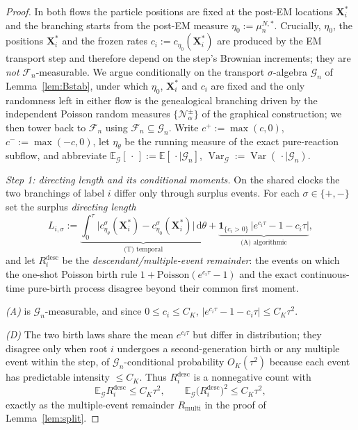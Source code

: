 \documentclass[a4paper,fleqn]{cas-sc}
\theoremstyle{definition}
\theoremstyle{remark}
\begin{document}
\begin{proof}
In both flows the particle positions are fixed at the post-EM locations
$\mathbf X^*_i$ and the branching starts from the post-EM measure
$\eta_0:=\mu^{N,*}_n$. Crucially, $\eta_0$, the positions $\mathbf X^*_i$ and the
frozen rates $c_i:=c_{\eta_0}(\mathbf X^*_i)$ are produced by the EM transport step
and therefore depend on the step's Brownian increments; they are \emph{not}
$\mathcal F_n$-measurable. We argue conditionally on the transport
$\sigma$-algebra $\mathcal G_n$ of Lemma~\ref{lem:Bstab}, under which $\eta_0$,
$\mathbf X^*_i$ and $c_i$ are fixed and the only randomness left in either flow is
the genealogical branching driven by the independent Poisson random measures
$\{\mathcal N^\pm_\alpha\}$ of the graphical construction; we then tower back to
$\mathcal F_n$ using $\mathcal F_n\subseteq\mathcal G_n$. Write $c^+:=\max(c,0)$,
$c^-:=\max(-c,0)$, let $\eta_\theta$ be the running measure of the exact
pure-reaction subflow, and abbreviate
$\mathbb E_{\mathcal G}[\,\cdot\,]:=\mathbb E[\,\cdot\mid\mathcal G_n]$,
$\operatorname{Var}_{\mathcal G}:=\operatorname{Var}(\,\cdot\mid\mathcal G_n)$.

\emph{Step 1: directing length and its conditional moments.} On the shared clocks
the two branchings of label $i$ differ only through surplus events. For each
$\sigma\in\{+,-\}$ set the surplus \emph{directing length}
\[
L_{i,\sigma}:=\underbrace{\int_0^\tau\bigl|c^\sigma_{\eta_\theta}(\mathbf X^*_i)
-c^\sigma_{\eta_0}(\mathbf X^*_i)\bigr|\,\mathrm d\theta}_{\text{(T) temporal}}
+\underbrace{\mathbf 1_{\{c_i>0\}}\,\bigl|e^{c_i\tau}-1-c_i\tau\bigr|}_{\text{(A) algorithmic}},
\]
and let $R^{\mathrm{desc}}_i$ be the \emph{descendant/multiple-event remainder}: the
events on which the one-shot Poisson birth rule $1+\mathrm{Poisson}(e^{c_i\tau}-1)$
and the exact continuous-time pure-birth process disagree beyond their common
first moment.

\emph{(A)} is $\mathcal G_n$-measurable, and since $0\le c_i\le C_K$,
$\bigl|e^{c_i\tau}-1-c_i\tau\bigr|\le C_K\tau^2$.

\emph{(D)} The two birth laws share the mean $e^{c_i\tau}$ but differ in
distribution; they disagree only when root $i$ undergoes a second-generation birth
or any multiple event within the step, of $\mathcal G_n$-conditional probability
$O_K(\tau^2)$ because each event has predictable intensity $\le C_K$. Thus
$R^{\mathrm{desc}}_i$ is a nonnegative count with
\[
\mathbb E_{\mathcal G}R^{\mathrm{desc}}_i\le C_K\tau^2,
\qquad
\mathbb E_{\mathcal G}\bigl(R^{\mathrm{desc}}_i\bigr)^2\le C_K\tau^2,
\]
exactly as the multiple-event remainder $R_{\mathrm{multi}}$ in the proof of
Lemma~\ref{lem:split}.


\end{proof}
\end{document}
